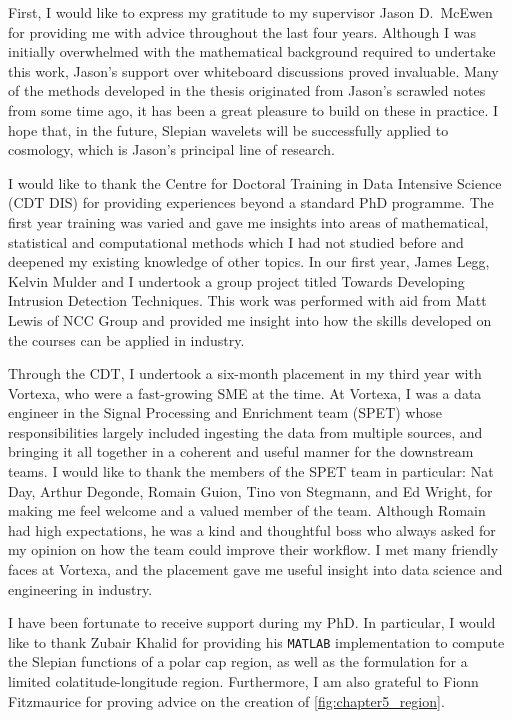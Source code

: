 \begin{acknowledgements}
	First, I would like to express my gratitude to my supervisor Jason D.~McEwen for providing me with advice throughout the last four years.
	Although I was initially overwhelmed with the mathematical background required to undertake this work, Jason's support over whiteboard discussions proved invaluable.
	Many of the methods developed in the thesis originated from Jason's scrawled notes from some time ago, it has been a great pleasure to build on these in practice.
	I hope that, in the future, Slepian wavelets will be successfully applied to cosmology, which is Jason's principal line of research.

	I would like to thank the Centre for Doctoral Training in Data Intensive Science (CDT DIS) for providing experiences beyond a standard PhD programme.
	The first year training was varied and gave me insights into areas of mathematical, statistical and computational methods which I had not studied before and deepened my existing knowledge of other topics.
	In our first year, James Legg, Kelvin Mulder and I undertook a group project titled Towards Developing Intrusion Detection Techniques.
	This work was performed with aid from Matt Lewis of NCC Group and provided me insight into how the skills developed on the courses can be applied in industry.

	Through the CDT, I undertook a six-month placement in my third year with Vortexa, who were a fast-growing SME at the time.
	At Vortexa, I was a data engineer in the Signal Processing and Enrichment team (SPET) whose responsibilities largely included ingesting the data from multiple sources, and bringing it all together in a coherent and useful manner for the downstream teams.
	I would like to thank the members of the SPET team in particular: Nat Day, Arthur Degonde, Romain Guion, Tino von Stegmann, and Ed Wright, for making me feel welcome and a valued member of the team.
	Although Romain had high expectations, he was a kind and thoughtful boss who always asked for my opinion on how the team could improve their workflow.
	I met many friendly faces at Vortexa, and the placement gave me useful insight into data science and engineering in industry.

	I have been fortunate to receive support during my PhD.
	In particular, I would like to thank Zubair Khalid for providing his \texttt{MATLAB} implementation to compute the Slepian functions of a polar cap region, as well as the formulation for a limited colatitude-longitude region.
	Furthermore, I am also grateful to Fionn Fitzmaurice for proving advice on the creation of \cref{fig:chapter5_region}.


\end{acknowledgements}
